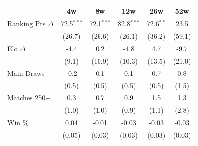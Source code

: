 \begin{tabular}{l*{5}{c}}
\toprule
 & 4w & 8w & 12w & 26w & 52w \\
\midrule
Ranking Pts $\Delta$ & 72.5$^{***}$ & 72.1$^{***}$ & 82.8$^{***}$ & 72.6$^{**}$ & 23.5 \\
 & (26.7) & (26.6) & (26.1) & (36.2) & (59.1) \\[0.3em]
Elo $\Delta$ & -4.4 & 0.2 & -4.8 & 4.7 & -9.7 \\
 & (9.1) & (10.9) & (10.3) & (13.5) & (21.0) \\[0.3em]
Main Draws & -0.2 & 0.1 & 0.1 & 0.7 & 0.8 \\
 & (0.5) & (0.5) & (0.5) & (0.5) & (1.5) \\[0.3em]
Matches 250+ & 0.3 & 0.7 & 0.9 & 1.5 & 1.3 \\
 & (1.0) & (1.0) & (0.9) & (1.1) & (2.8) \\[0.3em]
Win \% & 0.04 & -0.01 & -0.03 & -0.03 & -0.03 \\
 & (0.05) & (0.03) & (0.03) & (0.03) & (0.03) \\[0.3em]
\bottomrule
\end{tabular}

